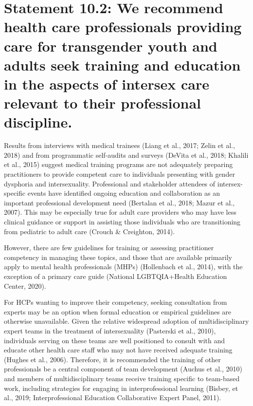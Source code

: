 \documentclass[
]{book}
\begin{document}
\hypertarget{statement-10.2-we-recommend-health-care-professionals-providing-care-for-transgender-youth-and-adults-seek-training-and-education-in-the-aspects-of-intersex-care-relevant-to-their-professional-discipline.}{%
\section*{Statement 10.2: We recommend health care professionals providing care for transgender youth and adults seek training and education in the aspects of intersex care relevant to their professional discipline.}\label{statement-10.2-we-recommend-health-care-professionals-providing-care-for-transgender-youth-and-adults-seek-training-and-education-in-the-aspects-of-intersex-care-relevant-to-their-professional-discipline.}}

Results from interviews with medical trainees
(Liang et al., 2017; Zelin et al., 2018) and from
programmatic self-audits and surveys (DeVita
et al., 2018; Khalili et al., 2015) suggest medical
training programs are not adequately preparing
practitioners to provide competent care to individuals presenting with gender dysphoria and
intersexuality. Professional and stakeholder
attendees of intersex-specific events have identified ongoing education and collaboration as
an important professional development need
(Bertalan et al., 2018; Mazur et al., 2007). This
may be especially true for adult care providers
who may have less clinical guidance or support
in assisting those individuals who are transitioning from pediatric to adult care (Crouch \&
Creighton, 2014).

However, there are few guidelines for training
or assessing practitioner competency in managing
these topics, and those that are available primarily
apply to mental health professionals (MHPs)
(Hollenbach et al., 2014), with the exception of
a primary care guide (National LGBTQIA+Health
Education Center, 2020).

For HCPs wanting to improve their competency, seeking consultation from experts may be
an option when formal education or empirical
guidelines are otherwise unavailable. Given the
relative widespread adoption of multidisciplinary
expert teams in the treatment of intersexuality
(Pasterski et al., 2010), individuals serving on
these teams are well positioned to consult with
and educate other health care staff who may not
have received adequate training (Hughes et al.,
2006). Therefore, it is recommended the training
of other professionals be a central component of
team development (Auchus et al., 2010) and
members of multidisciplinary teams receive training specific to team-based work, including strategies for engaging in interprofessional learning
(Bisbey, et al., 2019; Interprofessional Education
Collaborative Expert Panel, 2011).
\end{document}
